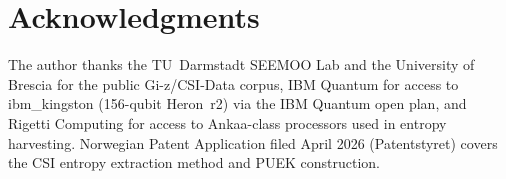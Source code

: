 \documentclass[conference]{IEEEtran}
\begin{document}


\section*{Acknowledgments}
The author thanks the TU~Darmstadt SEEMOO Lab and the University of Brescia for the public Gi-z/CSI-Data corpus, IBM Quantum for access to ibm\_kingston (156-qubit Heron~r2) via the IBM Quantum open plan, and Rigetti Computing for access to Ankaa-class processors used in entropy harvesting. Norwegian Patent Application filed April 2026 (Patentstyret) covers the CSI entropy extraction method and PUEK construction.



\end{document}
